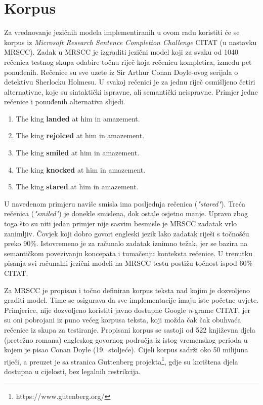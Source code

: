 \documentclass[times, utf8, diplomski, numeric]{fer}
\begin{document}
\section{Korpus}

Za vrednovanje jezičnih modela implementiranih u ovom radu koristiti će se korpus iz \textit{Microsoft Research Sentence Completion Challenge} CITAT (u nastavku MRSCC). Zadak u MRSCC je izgraditi jezični model koji za svaku od 1040 rečenica testnog skupa odabire točnu riječ koja rečenicu kompletira, između pet ponuđenih. Rečenice su sve uzete iz Sir Arthur Conan Doyle-ovog serijala o detektivu Sherlocku Holmesu. U svakoj rečenici je za jednu riječ osmišljeno četiri alternativne, koje su sintaktički ispravne, ali semantički neispravne. Primjer jedne rečenice i ponuđenih alternativa slijedi.

\begin{enumerate} 
\item{The king \textbf{landed} at him in amazement.}
\item{The king \textbf{rejoiced} at him in amazement.}
\item{The king \textbf{smiled} at him in amazement.}
\item{The king \textbf{knocked} at him in amazement.}
\item{The king \textbf{stared} at him in amazement.}
\end{enumerate}

U navedenom primjeru naviše smisla ima posljednja rečenica (\textit{"stared"}). Treća rečenica (\textit{"smiled"}) je donekle smislena, dok ostale osjetno manje. Upravo zbog toga što su niti jedan primjer nije sasvim besmisle je MRSCC zadatak vrlo zanimljiv. Čovjek koji dobro govori engleski jezik lako zadatak riješi s točnošću preko 90\%. Istovremeno je za računalo zadatak iznimno težak, jer se bazira na semantičkom povezivanju koncepata i tumačenju konteksta rečenice. U trenutku pisanja svi računalni jezični modeli na MRSCC testu postižu točnost ispod 60\% CITAT.

Za MRSCC je propisan i točno definiran korpus teksta nad kojim je dozvoljeno graditi model. Time se osigurava da sve implementacije imaju iste početne uvjete. Primjerice, nije dozvoljeno koristiti javno dostupne Google \textit{n}-grame CITAT, jer su oni pobrojani iz puno većeg korpusa teksta, koji možda čak čak obuhvaća rečenice iz skupa za testiranje. Propisani korpus se sastoji od 522 književna djela (pretežno romana) engleskog govornog područja iz istog vremenskog perioda u kojem je pisao Conan Doyle (19.\ stoljeće). Cijeli korpus sadrži oko 50 milijuna riječi, a preuzet je sa stranica Guttenberg projekta\footnote{https://www.gutenberg.org/}, gdje su korištena djela dostupna u cijelosti, bez legalnih restrikcija.
\end{document}
